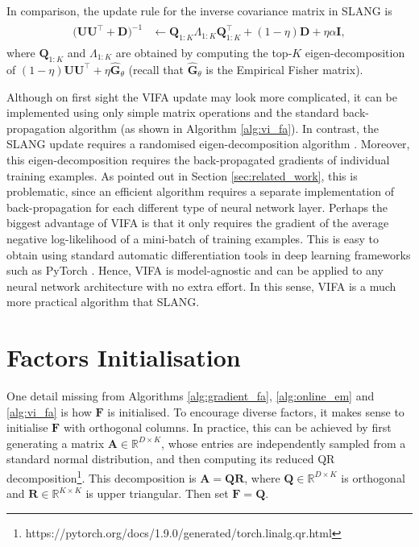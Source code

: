 \documentclass[msc,deptreport.inf]{infthesis} %
\newcommand{\matr}[1]{\mathbf{#1}}
\newcommand{\R}{\mathbb R}
\begin{document}
In comparison, the update rule for the inverse covariance matrix in SLANG is 
\begin{align}
\begin{split}
	\big(\matr{U}\matr{U}^\intercal + \matr{D}\big)^{-1}
	& \leftarrow  \matr{Q}_{1:K} \Lambda_{1:K} \matr{Q}_{1:K}^\intercal
	+ (1 - \eta) \matr{D} + \eta \alpha \matr{I},
\end{split}
\end{align}
where $\matr{Q}_{1:K}$ and $\Lambda_{1:K}$ are obtained by computing the top-$K$ eigen-decomposition of $(1 - \eta) \matr{U} \matr{U}^\intercal + \eta \hat{\matr{G}}_\theta$ (recall that $\hat{\matr{G}}_\theta$ is the Empirical Fisher matrix). 

Although on first sight the VIFA update may look more complicated, it can be implemented using only simple matrix operations and the standard back-propagation algorithm (as shown in Algorithm \ref{alg:vi_fa}). In contrast, the SLANG update requires a randomised eigen-decomposition algorithm \cite{mishkin2018}. Moreover, this eigen-decomposition requires the back-propagated gradients of individual training examples. As pointed out in Section \ref{sec:related_work}, this is problematic, since an efficient algorithm requires a separate implementation of back-propagation for each different type of neural network layer. Perhaps the biggest advantage of VIFA is that it only requires the gradient of the average negative log-likelihood of a mini-batch of training examples. This is easy to obtain using standard automatic differentiation tools in deep learning frameworks such as PyTorch \cite{paszke2019}. Hence, VIFA is model-agnostic and can be applied to any neural network architecture with no extra effort. In this sense, VIFA is a much more practical algorithm that SLANG.


\section{Factors Initialisation}\label{sec:F_init}

One detail missing from Algorithms \ref{alg:gradient_fa}, \ref{alg:online_em} and \ref{alg:vi_fa} is how $\matr{F}$ is initialised. To encourage diverse factors, it makes sense to initialise $\matr{F}$ with orthogonal columns. In practice, this can be achieved by first generating a matrix $\matr{A}  \in \R^{D \times K}$, whose entries are independently sampled from a standard normal distribution, and then computing its reduced QR decomposition\footnote{https://pytorch.org/docs/1.9.0/generated/torch.linalg.qr.html}. This decomposition is $\matr{A} = \matr{Q}\matr{R}$, where $\matr{Q} \in \R^{D \times K}$ is orthogonal and $\matr{R} \in \R^{K \times K}$ is upper triangular. Then set $\matr{F} = \matr{Q}$. 
\end{document}
